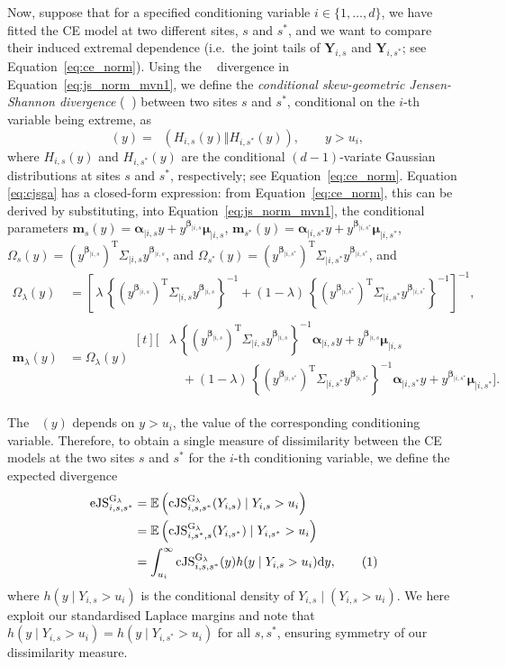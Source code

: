 \documentclass[preprint,12pt,authoryear]{elsarticle}
\newcommand{\JSGa}{\mathop{\mathrm{JS}^{\mathrm{G}_{\lambda}}}\nolimits}
\newcommand{\cJSGa}[1]{\mathop{\mathrm{cJS}_{i, #1}^{\mathrm{G}_{\lambda}}}\nolimits}
\newcommand{\eJSGa}[1]{\mathop{\mathrm{eJS}_{i, #1}^{\mathrm{G}_{\lambda}}}\nolimits}
\newcommand\numberthis{\addtocounter{equation}{1}\tag{\theequation}}
\newcommand{\mvmean}[1]{\boldsymbol{\alpha}_{\mid i, #1} y + y^{\boldsymbol{\beta}_{\mid i, #1}} \boldsymbol{\mu}_{\mid i, #1}}
\newcommand{\mvcov}[1]{\left(y^{\boldsymbol{\beta}_{\mid i, #1}}\right)^{\mathrm{T}} \Sigma_{\mid i, #1} y^{\boldsymbol{\beta}_{\mid i, #1}}}
\begin{document}
Now, suppose that for a specified conditioning variable $i \in \{1, \ldots, d\}$, we have fitted the CE model at two different sites, $s$ and $s^*$, and we want to compare their induced extremal dependence (i.e.\ the joint tails of $\boldsymbol{Y}_{i, s}$ and $\boldsymbol{Y}_{i, s^*}$; see Equation~\eqref{eq:ce_norm}). 
Using the $\JSGa{}$ divergence in Equation~\eqref{eq:js_norm_mvn1}, we define the \textit{conditional skew-geometric Jensen-Shannon divergence} ($\cJSGa{s, s^*}$) between two sites $s$ and $s^*$, conditional on the $i$-th variable being extreme, as
\begin{equation}\label{eq:cjsga}
  \cJSGa{s, s^*}(y) = \JSGa{}\left(H_{i, s}(y) \Vert H_{i, s^*}(y)\right),\qquad y > u_i,
\end{equation}
where $H_{i, s}(y)$ and $H_{i, s^*}(y)$ are the conditional $(d-1)$-variate Gaussian distributions at sites $s$ and $s^*$, respectively; see Equation~\eqref{eq:ce_norm}.
Equation \eqref{eq:cjsga} has a closed-form expression: from Equation~\eqref{eq:ce_norm}, this can be derived by substituting, into Equation~\eqref{eq:js_norm_mvn1}, the conditional parameters $\boldsymbol{m}_{s}(y) = \mvmean{s}$, $\boldsymbol{m}_{s^*}(y) = \mvmean{s^*}$, $\Omega_{s}(y) = \mvcov{s}$, and $\Omega_{s^*}(y) = \mvcov{s^*}$, 
and 
\begin{align*}
\Omega_{\lambda}(y)
  &= \left[\,\lambda\,\left\{\mvcov{s}\right\}^{-1}
           +(1-\lambda)\,\left\{\mvcov{s^{*}}\right\}^{-1}\right]^{-1},\\[6pt]
\boldsymbol{m}_{\lambda}(y)
  &= \Omega_{\lambda}(y)
     \begin{aligned}[t]
       \Biggl[&\lambda\,\left\{\mvcov{s}\right\}^{-1}\mvmean{s}\\
            &\quad +(1-\lambda)\,\left\{\mvcov{s^{*}}\right\}^{-1}\mvmean{s^{*}}\Biggr].
     \end{aligned}
\end{align*}

The $\cJSGa{s, s^*}(y)$ depends on $y > u_i$, the value of the corresponding conditioning variable. 
Therefore, to obtain a single measure of dissimilarity between the CE models at the two sites $s$ and $s^*$ for the $i$-th conditioning variable, we define the expected divergence
\begin{align*}
  \eJSGa{s, s^*} &= \mathbb{E}\left(\cJSGa{s, s^*}(Y_{i,s}) \mid Y_{i,s} > u_i\right) \\
                 &= \mathbb{E}\left(\cJSGa{s^*, s}(Y_{i,s^*}) \mid Y_{i,s^*} > u_i\right) \\
                 &= \int_{u_i}^{\infty} \cJSGa{s, s^*}(y) h(y \mid Y_{i,s} > u_i) \mathrm{d}y, \numberthis \label{eq:jsga_integral}
\end{align*}
where $h(y \mid Y_{i, s} > u_i)$ is the conditional density of $Y_{i, s} \mid (Y_{i, s} > u_i)$.
We here exploit our standardised Laplace margins and note that $h(y \mid Y_{i, s} > u_i) = h(y \mid Y_{i, s^*} > u_i)$ for all $s, s^*$, ensuring symmetry of our dissimilarity measure.
\end{document}
